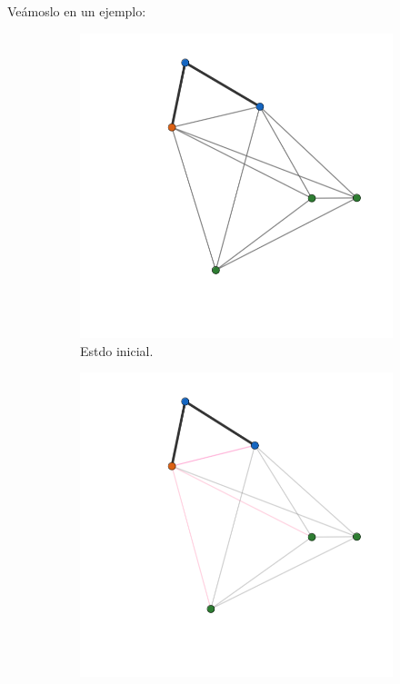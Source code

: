\documentclass{article}
\begin{document}
Veámoslo en un ejemplo: \\

\begin{figure}[H]
    \centering
    \begin{subfigure}[b]{0.35\textwidth}
        \centering
        \includegraphics[width=\textwidth]{imagenes/Grafos/Screenshots/Inicial.png}
        \caption{Estdo inicial.}
    \end{subfigure}
    \begin{subfigure}[b]{0.35\textwidth}
        \centering
        \includegraphics[width=\textwidth]{imagenes/Grafos/Screenshots/Origen1.png}

\end{subfigure}
\end{figure}
\end{document}

